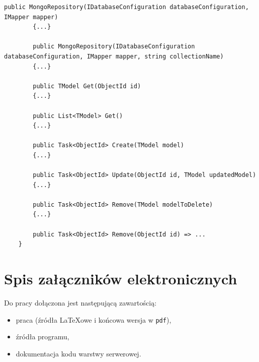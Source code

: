 \documentclass[a4paper,twoside,12pt]{book}
\begin{document}
\begin{appendices}
\begin{lstlisting}[caption={Klasa \textit{MongoRepository}}, label={lst:mongoRepository}, nolol=true]
		public MongoRepository(IDatabaseConfiguration databaseConfiguration, IMapper mapper)
		{...}
		
		public MongoRepository(IDatabaseConfiguration databaseConfiguration, IMapper mapper, string collectionName)
		{...}
		
		public TModel Get(ObjectId id)
		{...}
		
		public List<TModel> Get()
		{...}
		
		public Task<ObjectId> Create(TModel model)
		{...}
		
		public Task<ObjectId> Update(ObjectId id, TModel updatedModel)
		{...}
		
		public Task<ObjectId> Remove(TModel modelToDelete)
		{...}
		
		public Task<ObjectId> Remove(ObjectId id) => ...
	}
\end{lstlisting}

\chapter*{Spis załączników elektronicznych}

Do pracy dołączona jest następującą zawartością:
\begin{itemize}
\item praca (źródła \LaTeX owe i końcowa wersja w \texttt{pdf}),
\item źródła programu,
\item dokumentacja kodu warstwy serwerowej.
\end{itemize}

\listoffigures
	
\lstlistoflistings
	
\end{appendices}
\end{document}
